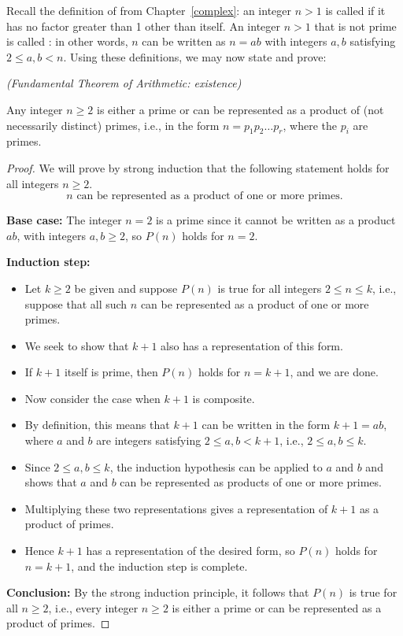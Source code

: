 Recall the definition of  from Chapter~\ref{complex}: an integer $n>1$ is called 
 if it has no factor greater than 1 other than itself. An integer $n>1$ that is not prime is called
: in other words, $n$ can be written as $n=ab$
with integers $a,b$ satisfying $2\le a,b<n$. Using these definitions, we may now state and prove:

\begin{prop}{}\emph{(Fundamental Theorem of Arithmetic: existence)}

Any integer $n\ge 2$
is either a prime or can be represented as a product of (not
necessarily distinct) primes, i.e., in the form $n=p_1p_2\dots p_r$,
where the $p_i$ are primes.
\end{prop}

\begin{proof}
We will prove by strong induction that the following statement  
holds for all integers $n\ge2$.
\[
\text{$n$ can be represented as a product of one or more primes.}
\tag{$P(n)$}
\]

\noindent
\textbf{Base case:} The integer $n=2$ is a prime since it cannot be
written as a product $ab$, with integers $a,b\ge 2$,  so $P(n)$ holds
for $n=2$.

\noindent
\textbf{Induction step:} 
\begin{itemize}

\item Let $k\ge2$ be given and suppose $P(n)$ is true for all 
integers $2\le n\le k$, i.e., suppose that all such $n$ can be represented 
as a product of one or more primes.
\item We seek to show that $k+1$ also has a
representation of this form.
\item
If $k+1$ itself is prime, then $P(n)$ holds for $n=k+1$, and we are done.
\item
Now consider the case when $k+1$ is composite.
\item 
By definition, this means that $k+1$
can be written in the form $k+1=ab$, where $a$ and $b$ are integers satisfying
$2\le a,b< k+1$, i.e., $2\le a,b\le k$. 
\item
Since $2\le a,b\le k$, the induction hypothesis can be applied to $a$ and $b$
and shows that $a$ and $b$ can be represented as products
of one or more primes.
\item
Multiplying these two representations gives a representation of $k+1$ as
a product of primes. 
\item
Hence $k+1$ has a representation of the desired form, so $P(n)$ holds
for $n=k+1$, and the induction step is
complete.
\end{itemize}

\noindent
\textbf{Conclusion:} By the strong induction principle, 
it follows that $P(n)$  is true for all $n\ge2$, i.e., every integer
$n\ge2$ is either a prime or can be represented as a product of primes.
\end{proof}

